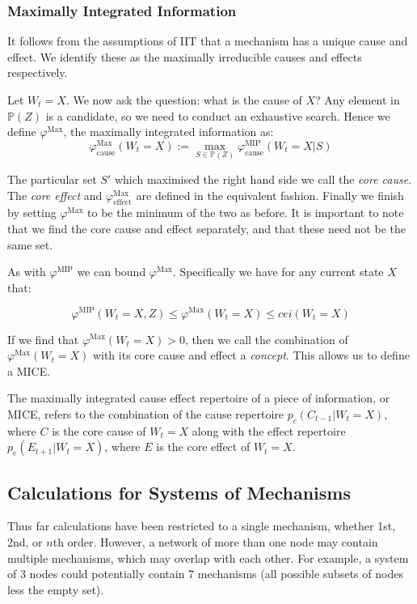 \subsubsection{Maximally Integrated Information}
It follows from the assumptions of IIT that a mechanism has a unique cause and effect. We identify these as the maximally irreducible causes and effects respectively. 

Let $W_t = X$. We now ask the question: what is the cause of $X$? Any element in $\mathbb{P}(Z)$ is a candidate, so we need to conduct an exhaustive search. Hence we define $\varphi^{\text{Max}}$, the maximally integrated information as: 
\begin{equation}
\label{def:core_cause}
\varphi^{\text{Max}}_{\text{cause}}(W_t = X):=\max \limits_{S \in \mathbb{P}(Z)}\varphi^{\text{MIP}}_{\text{cause}}(W_t = X|S)
\end{equation}

The particular set $S'$ which maximised the right hand side we call the \textit{core cause}. The \textit{core effect} and $\varphi^{\text{Max}}_{\text{effect}}$ are defined in the equivalent fashion. Finally we finish  by setting $\varphi^{\text{Max}}$ to be the minimum of the two as before. It is important to note that we find the core cause and effect separately, and that these need not be the same set.

As with $\varphi^{\text{MIP}}$ we can bound $\varphi^{\text{Max}}$. Specifically we have for any current state $X$ that:

\begin{equation}
\label{eq:bound_phimax}
\varphi^{\text{MIP}}(W_t = X, Z) \leq \varphi^{\text{Max}}(W_t = X)\leq cei(W_t = X)
\end{equation}

If we find that $\varphi^{\text{Max}}(W_t = X)>0$, then we call the combination of $\varphi^{\text{Max}}(W_t = X)$ with its core cause and effect a \textit{concept}. This allows us to define a MICE.

\begin{definition}
	{The maximally integrated cause effect repertoire of a piece of information, or MICE, refers to the combination of the cause repertoire $p_c(C_{t-1}|W_t = X)$, where $C$ is the core cause of $W_t=X$ along with the effect repertoire $p_e(E_{t+1}|W_t = X)$, where $E$ is the core effect of $W_t = X$.}
\end{definition}

\subsection{Calculations for Systems of Mechanisms}
Thus far calculations have been restricted to a single mechanism, whether 1st, 2nd, or $n$th order. However, a network of more than one node may contain multiple mechanisms, which may overlap with each other. For example, a system of 3 nodes could potentially contain 7 mechanisms (all possible subsets of nodes less the empty set).

